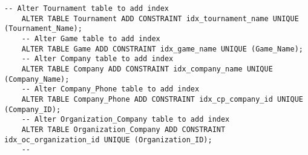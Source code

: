 \begin{lstlisting}[caption={Alter Table},label={lst:alter-table}]
    -- Alter Tournament table to add index
    ALTER TABLE Tournament ADD CONSTRAINT idx_tournament_name UNIQUE (Tournament_Name);
    -- Alter Game table to add index
    ALTER TABLE Game ADD CONSTRAINT idx_game_name UNIQUE (Game_Name);
    -- Alter Company table to add index
    ALTER TABLE Company ADD CONSTRAINT idx_company_name UNIQUE (Company_Name);
    -- Alter Company_Phone table to add index
    ALTER TABLE Company_Phone ADD CONSTRAINT idx_cp_company_id UNIQUE (Company_ID);
    -- Alter Organization_Company table to add index
    ALTER TABLE Organization_Company ADD CONSTRAINT idx_oc_organization_id UNIQUE (Organization_ID);
    --
\end{lstlisting}
